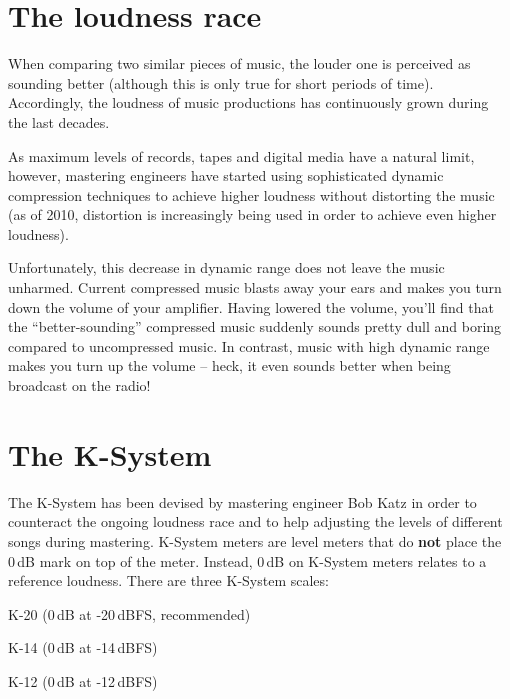 \maketitle

\tableofcontents

\clearpage  %

\chapter{The loudness race}

When comparing two similar pieces of music, the louder one is
perceived as sounding better (although this is only true for short
periods of time).  Accordingly, the loudness of music productions has
continuously grown during the last decades.

As maximum levels of records, tapes and digital media have a natural
limit, however, mastering engineers have started using sophisticated
dynamic compression techniques to achieve higher loudness without
distorting the music (as of 2010, distortion is increasingly being
used in order to achieve even higher loudness).

Unfortunately, this decrease in dynamic range does not leave the music
unharmed.  Current compressed music blasts away your ears and makes
you turn down the volume of your amplifier.  Having lowered the
volume, you'll find that the ``better-sounding'' compressed music
suddenly sounds pretty dull and boring compared to uncompressed music.
In contrast, music with high dynamic range makes you turn up the
volume -- heck, it even sounds better when being broadcast on the
radio!

\chapter{The K-System}

The K-System has been devised by mastering engineer Bob Katz in order
to counteract the ongoing loudness race and to help adjusting the
levels of different songs during mastering.  K-System meters are level
meters that do \textbf{not} place the 0\,dB mark on top of the meter.
Instead, 0\,dB on K-System meters relates to a reference loudness.
There are three K-System scales:

\begin{compactitem}
\item K-20 (0\,dB at -20\,dBFS, recommended)
\item K-14 (0\,dB at -14\,dBFS)
\item K-12 (0\,dB at -12\,dBFS)
\end{compactitem}

